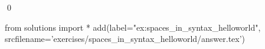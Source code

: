 
\begin{ex} 
  \label{ex:spaces_in_syntax_helloworld}
  
  \qed
\end{ex} 
\begin{python0}
from solutions import *
add(label="ex:spaces_in_syntax_helloworld",
    srcfilename='exercises/spaces_in_syntax_helloworld/answer.tex') 
\end{python0}
